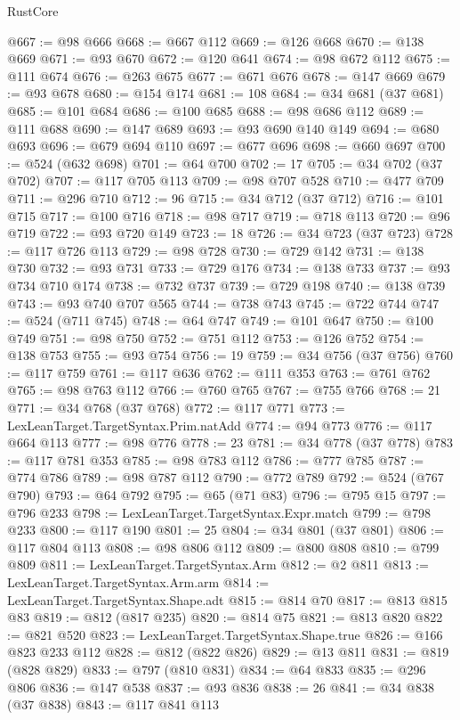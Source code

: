 \begin{lexlean}{RustCore}
\begin{coremodule}
@667 := @98 @666
@668 := @667 @112
@669 := @126 @668
@670 := @138 @669
@671 := @93 @670
@672 := @120 @641
@674 := @98 @672 @112
@675 := @111 @674
@676 := @263 @675
@677 := @671 @676
@678 := @147 @669
@679 := @93 @678
@680 := @154 @174
@681 := 108
@684 := @34 @681 (@37 @681)
@685 := @101 @684
@686 := @100 @685
@688 := @98 @686 @112
@689 := @111 @688
@690 := @147 @689
@693 := @93 @690 @140 @149
@694 := @680 @693
@696 := @679 @694 @110
@697 := @677 @696
@698 := @660 @697
@700 := @524 (@632 @698)
@701 := @64 @700
@702 := 17
@705 := @34 @702 (@37 @702)
@707 := @117 @705 @113
@709 := @98 @707 @528
@710 := @477 @709
@711 := @296 @710
@712 := 96
@715 := @34 @712 (@37 @712)
@716 := @101 @715
@717 := @100 @716
@718 := @98 @717
@719 := @718 @113
@720 := @96 @719
@722 := @93 @720 @149
@723 := 18
@726 := @34 @723 (@37 @723)
@728 := @117 @726 @113
@729 := @98 @728
@730 := @729 @142
@731 := @138 @730
@732 := @93 @731
@733 := @729 @176
@734 := @138 @733
@737 := @93 @734 @710 @174
@738 := @732 @737
@739 := @729 @198
@740 := @138 @739
@743 := @93 @740 @707 @565
@744 := @738 @743
@745 := @722 @744
@747 := @524 (@711 @745)
@748 := @64 @747
@749 := @101 @647
@750 := @100 @749
@751 := @98 @750
@752 := @751 @112
@753 := @126 @752
@754 := @138 @753
@755 := @93 @754
@756 := 19
@759 := @34 @756 (@37 @756)
@760 := @117 @759
@761 := @117 @636
@762 := @111 @353
@763 := @761 @762
@765 := @98 @763 @112
@766 := @760 @765
@767 := @755 @766
@768 := 21
@771 := @34 @768 (@37 @768)
@772 := @117 @771
@773 := LexLeanTarget.TargetSyntax.Prim.natAdd
@774 := @94 @773
@776 := @117 @664 @113
@777 := @98 @776
@778 := 23
@781 := @34 @778 (@37 @778)
@783 := @117 @781 @353
@785 := @98 @783 @112
@786 := @777 @785
@787 := @774 @786
@789 := @98 @787 @112
@790 := @772 @789
@792 := @524 (@767 @790)
@793 := @64 @792
@795 := @65 (@71 @83)
@796 := @795 @15
@797 := @796 @233
@798 := LexLeanTarget.TargetSyntax.Expr.match
@799 := @798 @233
@800 := @117 @190
@801 := 25
@804 := @34 @801 (@37 @801)
@806 := @117 @804 @113
@808 := @98 @806 @112
@809 := @800 @808
@810 := @799 @809
@811 := LexLeanTarget.TargetSyntax.Arm
@812 := @2 @811
@813 := LexLeanTarget.TargetSyntax.Arm.arm
@814 := LexLeanTarget.TargetSyntax.Shape.adt
@815 := @814 @70
@817 := @813 @815 @83
@819 := @812 (@817 @235)
@820 := @814 @75
@821 := @813 @820
@822 := @821 @520
@823 := LexLeanTarget.TargetSyntax.Shape.true
@826 := @166 @823 @233 @112
@828 := @812 (@822 @826)
@829 := @13 @811
@831 := @819 (@828 @829)
@833 := @797 (@810 @831)
@834 := @64 @833
@835 := @296 @806
@836 := @147 @538
@837 := @93 @836
@838 := 26
@841 := @34 @838 (@37 @838)
@843 := @117 @841 @113

\end{coremodule}
\end{lexlean}
